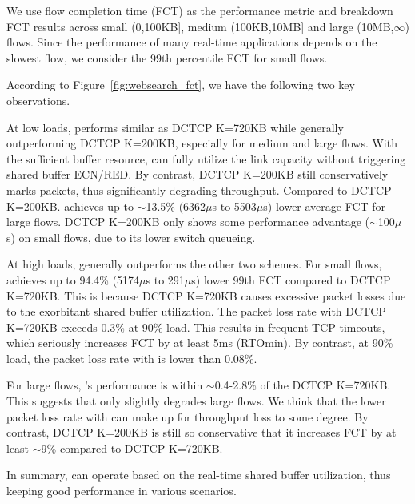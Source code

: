 \vspace{-1mm}
We use flow completion time (FCT) as the performance metric and breakdown FCT results across small (0,100KB], medium (100KB,10MB] and large (10MB,$\infty$) flows. Since the performance of many real-time applications depends on the slowest flow, we consider the 99th percentile FCT for small flows.

\vspace{-1mm}
According to Figure~\ref{fig:websearch_fct}, we have the following two key observations.
\begin{ecompact}
\vspace{-1mm}
\item At low loads, \sys performs similar as DCTCP K=720KB while generally outperforming DCTCP K=200KB, especially for medium and large flows. With the sufficient buffer resource, \sys can fully utilize the link capacity without triggering shared buffer ECN/RED. By contrast, DCTCP K=200KB still conservatively marks packets, thus significantly degrading throughput. Compared to DCTCP K=200KB. \sys achieves up to $\sim$13.5\% (6362$\mu$s to 5503$\mu$s) lower average FCT for large flows.  DCTCP K=200KB only shows some performance advantage ($\sim$100$\mu$s) on small flows, due to its lower switch queueing.
\vspace{-1mm}
\item At high loads, \sys generally outperforms the other two schemes. For small flows, \sys achieves up to  94.4\% (5174$\mu$s to 291$\mu$s) lower 99th FCT compared to DCTCP K=720KB. This is because DCTCP K=720KB causes excessive packet losses due to the exorbitant shared buffer utilization. The packet loss rate with DCTCP K=720KB exceeds 0.3\% at 90\% load. This results in frequent TCP timeouts, which seriously increases FCT by at least 5ms (RTOmin). By contrast, at 90\% load, the packet loss rate with \sys is lower than 0.08\%.

    For large flows, \sys's performance is within $\sim$0.4-2.8\% of the DCTCP K=720KB. This suggests that \sys only slightly degrades large flows. We think that the lower packet loss rate with \sys can make up for throughput loss to some degree. By contrast, DCTCP K=200KB is still so conservative that it increases FCT by at least $\sim$9\% compared to DCTCP K=720KB.
\end{ecompact}
In summary, \sys can operate based on the real-time shared buffer utilization, thus keeping good performance in various scenarios.


